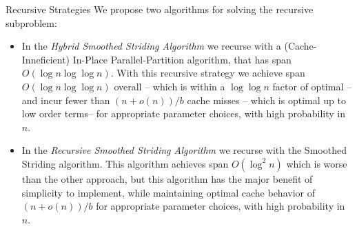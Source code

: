 \documentclass[table,serif,mathserif,final]{beamer}
\theoremstyle{remark}
\begin{document}
\begin{frame}{}
\begin{columns}[t]
\begin{column}{0.21\linewidth}
\begin{block}{\Huge Recursive Strategies}
  \justifying
  \Huge We propose two algorithms for solving the recursive subproblem: \\
	\begin{itemize}
    \item In the \emph{Hybrid Smoothed Striding Algorithm} we recurse with a (Cache-Inneficient) In-Place Parallel-Partition algorithm, that has span $O(\log n \log \log n)$. With this recursive strategy we achieve span $O(\log n \log \log n)$ overall -- which is within a $\log\log n$ factor of optimal -- and incur fewer than $(n+o(n))/b$ cache misses -- which is optimal up to low order terms-- for appropriate parameter choices, with high probability in $n$.
    \item In the \emph{Recursive Smoothed Striding Algorithm} we recurse with the Smoothed Striding algorithm. {\color{red}This algorithm achieves span $O(\log^2 n)$ which is worse than the other approach,} but this algorithm {\color{blue} has the major benefit of simplicity to implement, while maintaining optimal cache behavior of $(n+o(n))/b$ for appropriate parameter choices, with high probability in $n$}.
	\end{itemize}
\end{block}
\vspace{1cm}



\vspace{1cm}


\end{column}
\end{columns}
\end{frame}
\end{document}

